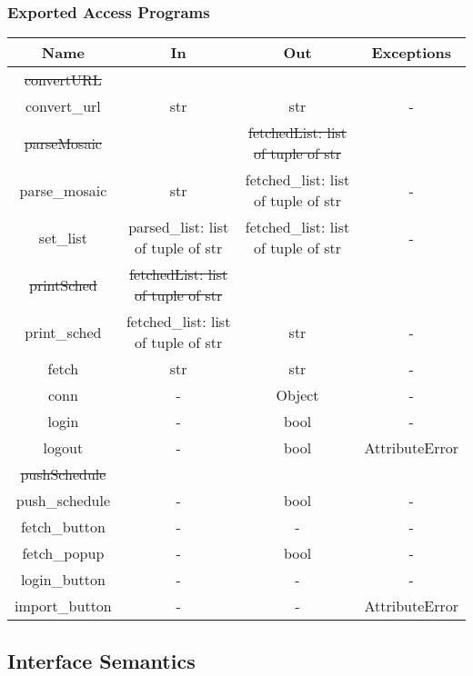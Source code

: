 \documentclass[12pt, titlepage]{article}
\begin{document}
\subsubsection{Exported Access Programs}
\begin{tabular}[pos]{|c|c|c|c|}
	\hline
	\textbf{Name}& \textbf{In} & \textbf{Out} & \textbf{Exceptions} \\ \hline
    \sout{convertURL} &  &  &  \\ 
    \color{blue}convert\_url\color{black} & str & str & - \\ \hline		
	\sout{parseMosaic} &  & \sout{fetchedList: list of tuple of str} &  \\  
	\color{blue}parse\_mosaic\color{black} & str &  \color{blue}fetched\_list\color{black}: list of tuple of str & -\\ \hline
	\color{blue}set\_list & \color{blue}parsed\_list: list of tuple of str & \color{blue}fetched\_list: list of tuple of str & \color{blue}-\color{black} \\ \hline
    \sout{printSched} & \sout{fetchedList: list of tuple of str} &  &  \\ 
    \color{blue}print\_sched\color{black} & \color{blue}fetched\_list\color{black}: list of tuple of str & str & - \\ \hline	
	fetch & str & str & - \\ \hline
	conn & - & Object & - \\ \hline	
	login & - & bool & - \\ \hline
	logout & - & \color{blue}bool\color{black} & \color{blue}AttributeError\color{black} \\ \hline	
    \sout{pushSchedule} &   &  & \\ 
    \color{blue}push\_schedule\color{black} & - & bool & - \\ \hline
	\color{blue}fetch\_button & \color{blue}- & \color{blue}- & \color{blue}-\color{black} \\ \hline
	\color{blue}fetch\_popup & \color{blue}- & \color{blue}bool & \color{blue}-\color{black} \\ \hline	
	\color{blue}login\_button & \color{blue}- & \color{blue}- & \color{blue}-\color{black} \\ \hline
	\color{blue}import\_button & \color{blue}- & \color{blue}- & \color{blue}AttributeError\color{black} \\ \hline
\end{tabular}

\subsection{Interface Semantics}
\end{document}
